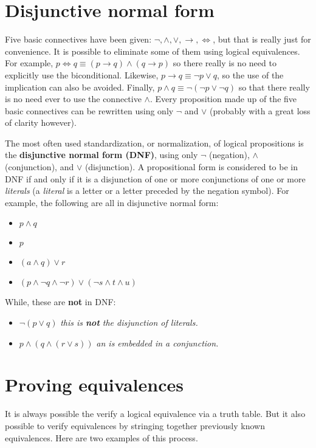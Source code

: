 \section{Disjunctive normal form}%
Five basic connectives have been given: $\lnot, \land, \lor, \to, \iff$, but that is really just
for convenience. It is possible to eliminate some of them using logical equivalences.
For example, $p\iff q \equiv (p\to q)\land (q\to p)$ so there really is no need to
explicitly use the biconditional. Likewise, $p\to q \equiv \lnot p\lor q$, so the use
of the implication can also be avoided. Finally, $p\land q \equiv \lnot(\lnot p \lor\lnot q)$
so that there really is no need ever to use the connective $\land$. Every proposition
made up of the five basic connectives can be rewritten using only $\lnot$ and $\lor$ (probably
with a great loss of  clarity however). 

The most often used standardization, or normalization, of logical propositions is the
\textbf{disjunctive normal form (DNF)}, using only $\lnot$ (negation), $\land$ (conjunction), 
and $\lor$ (disjunction). A propositional form is considered to be in DNF if and only if it is a disjunction of one or more conjunctions of one or more {\it literals} (a {\itshape literal} is a letter or a letter preceded by the negation symbol). For example, the following are
all in disjunctive normal form:
\begin{itemize}
\item $p \land q$
\item $p$
\item $(a \land q) \lor r$
\item $(p \land \lnot q \land \lnot r) \lor (\lnot s \land t \land u)$
\end{itemize}
While, these are \textbf{not} in DNF:
\begin{itemize}
\item  $\lnot(p \lor q)$ \em this is \textbf{not} the disjunction of literals.
\item $p \land (q \land (r \lor s))$ \em an  is embedded in a conjunction.
\end{itemize}

\section{Proving equivalences}
It is always possible the verify a logical equivalence via a truth table. But it also possible to
verify equivalences by stringing together previously known equivalences. Here are
two examples of this process.

